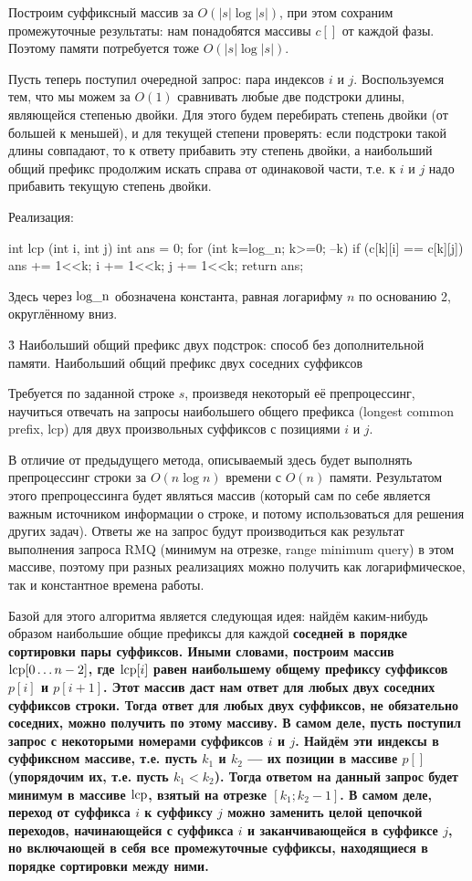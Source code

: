 Построим суффиксный массив за $O (|s| \log |s|)$, при этом сохраним промежуточные результаты: нам понадобятся массивы $c[]$ от каждой фазы. Поэтому памяти потребуется тоже $O (|s| \log |s|)$.

Пусть теперь поступил очередной запрос: пара индексов $i$ и $j$. Воспользуемся тем, что мы можем за $O(1)$ сравнивать любые две подстроки длины, являющейся степенью двойки. Для этого будем перебирать степень двойки (от большей к меньшей), и для текущей степени проверять: если подстроки такой длины совпадают, то к ответу прибавить эту степень двойки, а наибольший общий префикс продолжим искать справа от одинаковой части, т.е. к $i$ и $j$ надо прибавить текущую степень двойки.

Реализация:

\code
int lcp (int i, int j) {
	int ans = 0;
	for (int k=log_n; k>=0; --k)
		if (c[k][i] == c[k][j]) {
			ans += 1<<k;
			i += 1<<k;
			j += 1<<k;
		}
	return ans;
}
\endcode

Здесь через $\rm log\_n$ обозначена константа, равная логарифму $n$ по основанию 2, округлённому вниз.


\h3{ Наибольший общий префикс двух подстрок: способ без дополнительной памяти. Наибольший общий префикс двух соседних суффиксов }

Требуется по заданной строке $s$, произведя некоторый её препроцессинг, научиться отвечать на запросы наибольшего общего префикса (longest common prefix, lcp) для двух произвольных суффиксов с позициями $i$ и $j$.

В отличие от предыдущего метода, описываемый здесь будет выполнять препроцессинг строки за $O(n \log n)$ времени с $O(n)$ памяти. Результатом этого препроцессинга будет являться массив (который сам по себе является важным источником информации о строке, и потому использоваться для решения других задач). Ответы же на запрос будут производиться как результат выполнения запроса RMQ (минимум на отрезке, range minimum query) в этом массиве, поэтому при разных реализациях можно получить как логарифмическое, так и константное времена работы.

Базой для этого алгоритма является следующая идея: найдём каким-нибудь образом наибольшие общие префиксы для каждой \bf{соседней в порядке сортировки пары суффиксов}. Иными словами, построим массив ${\rm lcp}[0 \ldots n-2]$, где ${\rm lcp}[i]$ равен наибольшему общему префиксу суффиксов $p[i]$ и $p[i+1]$. Этот массив даст нам ответ для любых двух соседних суффиксов строки. Тогда ответ для любых двух суффиксов, не обязательно соседних, можно получить по этому массиву. В самом деле, пусть поступил запрос с некоторыми номерами суффиксов $i$ и $j$. Найдём эти индексы в суффиксном массиве, т.е. пусть $k_1$ и $k_2$ --- их позиции в массиве $p[]$ (упорядочим их, т.е. пусть $k_1 < k_2$). Тогда ответом на данный запрос будет минимум в массиве $\rm lcp$, взятый на отрезке $[k_1; k_2-1]$. В самом деле, переход от суффикса $i$ к суффиксу $j$ можно заменить целой цепочкой переходов, начинающейся с суффикса $i$ и заканчивающейся в суффиксе $j$, но включающей в себя все промежуточные суффиксы, находящиеся в порядке сортировки между ними.

